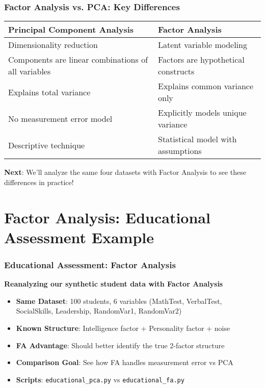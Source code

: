 \documentclass[aspectratio=169]{beamer}
\begin{document}
\begin{frame}[fragile]
    \frametitle{Factor Analysis vs. PCA: Key Differences}
    \begin{center}
    \begin{tabular}{|p{5cm}|p{5cm}|}
    \hline
    \textbf{Principal Component Analysis} & \textbf{Factor Analysis} \\
    \hline
    Dimensionality reduction & Latent variable modeling \\
    \hline
    Components are linear combinations of all variables & Factors are hypothetical constructs \\
    \hline
    Explains total variance & Explains common variance only \\
    \hline
    No measurement error model & Explicitly models unique variance \\
    \hline
    Descriptive technique & Statistical model with assumptions \\
    \hline
    \end{tabular}
    \end{center}
    \vspace{12pt}
    \textbf{Next}: We'll analyze the same four datasets with Factor Analysis to see these differences in practice!
\end{frame}

\section{Factor Analysis: Educational Assessment Example}

\begin{frame}
    \frametitle{Educational Assessment: Factor Analysis}
    \textbf{Reanalyzing our synthetic student data with Factor Analysis}
    \begin{itemize}
        \item \textbf{Same Dataset}: 100 students, 6 variables (MathTest, VerbalTest, SocialSkills, Leadership, RandomVar1, RandomVar2) \pause
        \item \textbf{Known Structure}: Intelligence factor + Personality factor + noise \pause
        \item \textbf{FA Advantage}: Should better identify the true 2-factor structure \pause
        \item \textbf{Comparison Goal}: See how FA handles measurement error vs PCA \pause
        \item \textbf{Scripts}: \texttt{educational\_pca.py} vs \texttt{educational\_fa.py}
    \end{itemize}
\end{frame}
\end{document}
